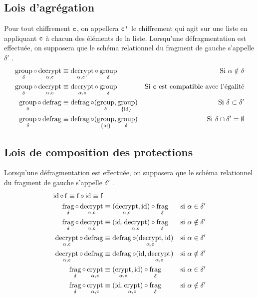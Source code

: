 \documentclass[french]{article}
\DeclareMathOperator{\frag}{frag}
\DeclareMathOperator{\defrag}{defrag}
\DeclareMathOperator{\crypt}{crypt}
\DeclareMathOperator{\decrypt}{decrypt}
\DeclareMathOperator{\group}{group}
\DeclareMathOperator{\id}{id}
\newcommand\typeT[1]{\text{\ttfamily #1}}
\newcommand{\decryptArgs}[2]{\decrypt_{#1 , \typeT{#2}}}
\newcommand{\cryptArgs}[2]{\crypt_{#1 , \typeT{#2}}}
\newcommand{\decryptCAlpha}{\decryptArgs{\alpha}{c}}
\newcommand{\cryptCAlpha}{\cryptArgs{\alpha}{c}}
\newcommand{\ch}{\typeT{c}}
\newcommand{\chp}{\typeT{c'}}
\newcommand{\groupDelta}{\group_{\delta}}
\newcommand{\fragDelta}{\frag_{\delta}}
\begin{document}
\subsection*{Lois d'agrégation}
Pour tout chiffrement $\ch$,
on appellera $\chp$
le chiffrement qui agit sur une liste en appliquant
$\ch$ à chacun des éléments de la liste.
Lorsqu'une défragmentation est effectuée, on supposera que le schéma relationnel
du fragment de gauche s'appelle $\delta'$ .
\begin{align}
\groupDelta \circ \decryptCAlpha
& \equiv \decryptArgs{\alpha}{\chp} \circ \groupDelta
& \text{Si $\alpha \notin \delta$} \\
\groupDelta \circ \decryptCAlpha
& \equiv \decryptCAlpha \circ \groupDelta
& \text{Si $\ch$ est compatible avec l'égalité} \\
\groupDelta \circ \defrag 
& \equiv \defrag \circ (\groupDelta, \group_{\{\id\}})
& \text{Si $\delta \subset \delta'$} \\
\groupDelta \circ \defrag 
& \equiv \defrag \circ (\group_{\{\id\}}, \groupDelta)
& \text{Si $\delta \cap \delta' = \emptyset$} 
\end{align}

\subsection*{Lois de composition des protections}
Lorsqu'une défragmentation est effectuée, on supposera que le schéma relationnel
du fragment de gauche s'appelle $\delta'$ .
\begin{align}
\id \circ \operatorname{f}
\equiv \operatorname{f} \circ \id
\equiv \operatorname{f} \\
\fragDelta \circ \decryptCAlpha
& \equiv (\decryptCAlpha, \id) \circ \fragDelta
& \text{si $\alpha \in \delta'$} \\
\fragDelta \circ \decryptCAlpha
& \equiv (\id, \decryptCAlpha) \circ \fragDelta
& \text{si $\alpha \notin \delta'$} \\
\decryptCAlpha \circ \defrag 
& \equiv \defrag \circ (\decryptCAlpha, \id)
& \text{si $\alpha \in \delta'$} \\
\decryptCAlpha \circ \defrag 
& \equiv \defrag \circ (\id, \decryptCAlpha)
& \text{si $\alpha \notin \delta'$} \\
\fragDelta \circ \cryptCAlpha
& \equiv (\cryptCAlpha, \id) \circ\fragDelta 
& \text{si $\alpha \in \delta'$} \\
\fragDelta \circ \cryptCAlpha
& \equiv (\id, \cryptCAlpha) \circ\fragDelta 
& \text{si $\alpha \notin \delta'$}
\end{align}
\end{document}
